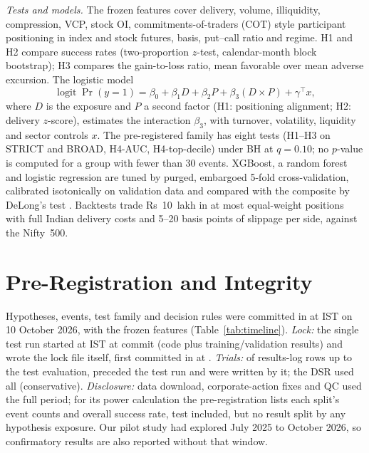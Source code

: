 \documentclass[conference]{IEEEtran}
\begin{document}
\emph{Tests and models.} The \NFeatures{} frozen features cover delivery, volume, illiquidity, compression,
VCP, stock OI, commitments-of-traders (COT) style participant positioning in index and stock futures, basis,
put--call ratio and regime. H1 and H2 compare success rates (two-proportion $z$-test, calendar-month block
bootstrap); H3 compares the gain-to-loss ratio, mean favorable over mean adverse excursion. The logistic model
\begin{equation}
\operatorname{logit}\Pr(y=1)=\beta_0+\beta_1 D+\beta_2 P+\beta_3 (D\times P)+\gamma^{\top}x,
\label{eq:logit}
\end{equation}
where $D$ is the exposure and $P$ a second factor (H1: positioning alignment; H2: delivery $z$-score),
estimates the interaction $\beta_3$, with turnover, volatility, liquidity and sector controls $x$. The
pre-registered family has eight tests (H1--H3 on STRICT and BROAD, H4-AUC, H4-top-decile) under BH at
$q=0.10$; no $p$-value is computed for a group with fewer than 30 events. XGBoost, a random forest and logistic
regression are tuned by purged, embargoed 5-fold cross-validation, calibrated isotonically on validation data
and compared with the composite by DeLong's test \cite{delong1988}. Backtests trade Rs~10~lakh in at most
\MaxPositions{} equal-weight positions with full Indian delivery costs and 5--20 basis points of slippage per
side, against the Nifty~500.

\section{Pre-Registration and Integrity}\label{sec:prereg}
Hypotheses, events, test family and decision rules were committed in \texttt{\PreregCommit} at \PreregTime{}
IST on 10 October 2026, with the frozen features (Table~\ref{tab:timeline}). \emph{Lock:} the single test run
started at \LockStart{} IST at commit \texttt{\LockHead} (code plus training/validation results) and wrote the
lock file itself, first committed in \texttt{\LockCommit} at \LockCommitTime. \emph{Trials:} of
\TrialsThroughPSix{} results-log rows up to the test evaluation, \TrialsBefore{} preceded the test run and
\TrialsTestRun{} were written by it; the DSR used all \DSRtrials{} (conservative). \emph{Disclosure:} data
download, corporate-action fixes and QC used the full period; for its power calculation the pre-registration
lists each split's event counts and overall success rate, test included, but no result split by any
hypothesis exposure. Our pilot study had explored July 2025 to October 2026, so confirmatory results are also
reported without that window.
\end{document}

